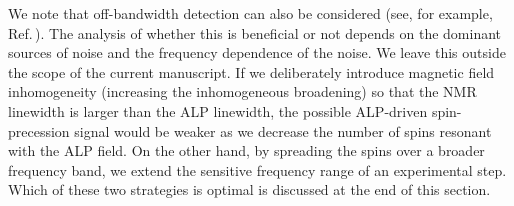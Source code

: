 We note that off-bandwidth detection can also be considered (see, for example, Ref.\,\cite{Bloch2022NASDUCK_SERF}). The analysis of whether this is beneficial or not depends on the dominant sources of noise and the frequency dependence of the noise. We leave this outside the scope of the current manuscript. 
If we deliberately introduce magnetic field inhomogeneity (increasing the inhomogeneous broadening) so that the NMR linewidth is larger than the ALP linewidth, the possible ALP-driven spin-precession signal would be weaker as we decrease the number of spins resonant with the ALP field.
On the other hand, by spreading the spins over a broader frequency band, we extend the sensitive frequency range of an experimental step. 
Which of these two strategies is optimal is discussed at the end of this section. 



